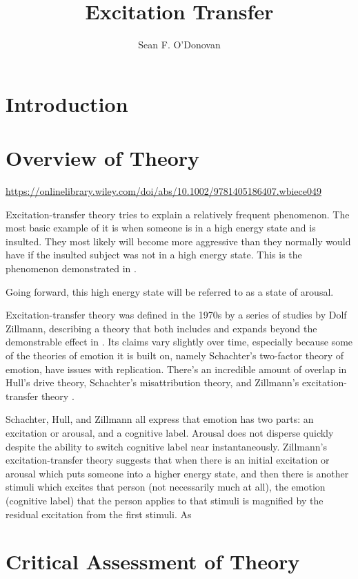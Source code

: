 \documentclass[
  stu]{apa7}
\affiliation{Brian Lamb School of Communication}
\title{Excitation Transfer}
\author{Sean F. O'Donovan}
\date{}
\begin{document}
\maketitle

\hypertarget{introduction}{%
\section{Introduction}\label{introduction}}

\textcite{zillmann08}

\hypertarget{overview-of-theory}{%
\section{Overview of Theory}\label{overview-of-theory}}

\url{https://onlinelibrary.wiley.com/doi/abs/10.1002/9781405186407.wbiece049}

Excitation-transfer theory tries to explain a relatively frequent
phenomenon. The most basic example of it is when someone is in a high
energy state and is insulted. They most likely will become more
aggressive than they normally would have if the insulted subject was not
in a high energy state. This is the phenomenon demonstrated in
\textcite{zilEffectResidualExcitation}.

Going forward, this high energy state will be referred to as a state of
arousal.

Excitation-transfer theory was defined in the 1970s by a series of
studies by Dolf Zillmann, describing a theory that both includes and
expands beyond the demonstrable effect in
\textcite{zilEffectResidualExcitation}. Its claims vary slightly over
time, especially because some of the theories of emotion it is built on,
namely Schachter's two-factor theory of emotion, have issues with
replication. There's an incredible amount of overlap in Hull's drive
theory, Schachter's misattribution theory, and Zillmann's
excitation-transfer theory
\autocite{bryExcitationTransferTheoryThreeFactor}.

Schachter, Hull, and Zillmann all express that emotion has two parts: an
excitation or arousal, and a cognitive label. Arousal does not disperse
quickly despite the ability to switch cognitive label near
instantaneously. Zillmann's excitation-transfer theory suggests that
when there is an initial excitation or arousal which puts someone into a
higher energy state, and then there is another stimuli which excites
that person (not necessarily much at all), the emotion (cognitive label)
that the person applies to that stimuli is magnified by the residual
excitation from the first stimuli. As \textcite{bry}

\hypertarget{critical-assessment-of-theory}{%
\section{Critical Assessment of
Theory}\label{critical-assessment-of-theory}}

\printbibliography[title=Conclusion]
\end{document}

